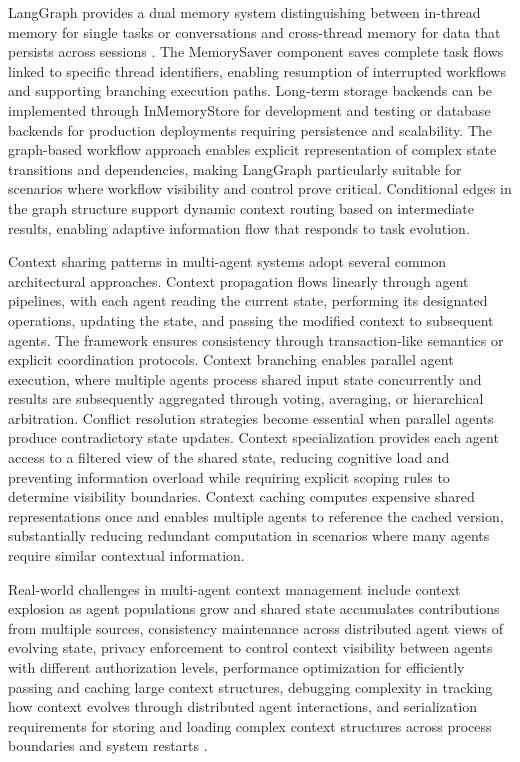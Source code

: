 \documentclass[11pt,letterpaper]{article}
\begin{document}
LangGraph provides a dual memory system distinguishing between in-thread memory for single tasks or conversations and cross-thread memory for data that persists across sessions \cite{langchain2024langgraph}. The MemorySaver component saves complete task flows linked to specific thread identifiers, enabling resumption of interrupted workflows and supporting branching execution paths. Long-term storage backends can be implemented through InMemoryStore for development and testing or database backends for production deployments requiring persistence and scalability. The graph-based workflow approach enables explicit representation of complex state transitions and dependencies, making LangGraph particularly suitable for scenarios where workflow visibility and control prove critical. Conditional edges in the graph structure support dynamic context routing based on intermediate results, enabling adaptive information flow that responds to task evolution.

Context sharing patterns in multi-agent systems adopt several common architectural approaches. Context propagation flows linearly through agent pipelines, with each agent reading the current state, performing its designated operations, updating the state, and passing the modified context to subsequent agents. The framework ensures consistency through transaction-like semantics or explicit coordination protocols. Context branching enables parallel agent execution, where multiple agents process shared input state concurrently and results are subsequently aggregated through voting, averaging, or hierarchical arbitration. Conflict resolution strategies become essential when parallel agents produce contradictory state updates. Context specialization provides each agent access to a filtered view of the shared state, reducing cognitive load and preventing information overload while requiring explicit scoping rules to determine visibility boundaries. Context caching computes expensive shared representations once and enables multiple agents to reference the cached version, substantially reducing redundant computation in scenarios where many agents require similar contextual information.

Real-world challenges in multi-agent context management include context explosion as agent populations grow and shared state accumulates contributions from multiple sources, consistency maintenance across distributed agent views of evolving state, privacy enforcement to control context visibility between agents with different authorization levels, performance optimization for efficiently passing and caching large context structures, debugging complexity in tracking how context evolves through distributed agent interactions, and serialization requirements for storing and loading complex context structures across process boundaries and system restarts \cite{foxgem2024memory}.
\end{document}
